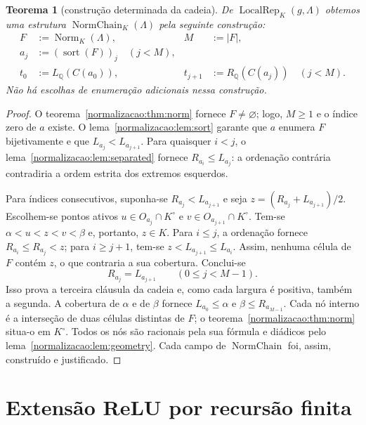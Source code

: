 \documentclass[12pt,a4paper]{article}
\theoremstyle{preciso}
\newtheorem{teorema}{Teorema}[section]
\theoremstyle{definition}
\newcommand{\Q}{\mathbb Q}
\newcommand{\Norm}{\operatorname{Norm}}
\newcommand{\Loc}{\operatorname{LocalRep}}
\theoremstyle{preciso}
\theoremstyle{preciso}
\theoremstyle{preciso}
\theoremstyle{preciso}
\theoremstyle{definition}
\theoremstyle{preciso}
\theoremstyle{definition}
\theoremstyle{preciso}
\theoremstyle{preciso}
\theoremstyle{definition}
\begin{document}
\begin{teorema}[construção determinada da cadeia]\label{map:normalizacao:7.4}\label{normalizacao:thm:chain}
De $\Loc_K(g,\Lambda)$ obtemos uma estrutura
$\operatorname{NormChain}_K(\Lambda)$ pela seguinte construção:
\begin{align*}
 F&:=\Norm_K(\Lambda),& M&:=|F|,\\
 a_j&:=(\operatorname{sort}(F))_j\quad(j<M),\\
 t_0&:=L_\Q(C(a_0)),&
 t_{j+1}&:=R_\Q(C(a_j))\quad(j<M).
\end{align*}
Não há escolhas de enumeração adicionais nessa construção.
\end{teorema}
\begin{proof}
O teorema~\ref{normalizacao:thm:norm} fornece $F\ne\varnothing$; logo, $M\ge1$
e o índice zero de $a$ existe. O lema~\ref{normalizacao:lem:sort} garante
que $a$ enumera $F$ bijetivamente e que $L_{a_j}<L_{a_{j+1}}$.
Para quaisquer $i<j$, o lema~\ref{normalizacao:lem:separated} fornece
$R_{a_i}\le L_{a_j}$: a ordenação contrária contradiria a ordem
estrita dos extremos esquerdos.

Para índices consecutivos, suponha-se
$R_{a_j}<L_{a_{j+1}}$ e seja
$z=(R_{a_j}+L_{a_{j+1}})/2$. Escolhem-se pontos ativos
$u\in O_{a_j}\cap K^\circ$ e
$v\in O_{a_{j+1}}\cap K^\circ$. Tem-se
$\alpha<u<z<v<\beta$ e, portanto, $z\in K$.
Para $i\le j$, a ordenação fornece $R_{a_i}\le R_{a_j}<z$;
para $i\ge j+1$, tem-se $z<L_{a_{j+1}}\le L_{a_i}$.
Assim, nenhuma célula de $F$ contém $z$, o que contraria a sua cobertura.
Conclui-se
\[
 R_{a_j}=L_{a_{j+1}}\qquad(0\le j<M-1).
\]
Isso prova a terceira cláusula da cadeia e, como cada largura é
positiva, também a segunda. A cobertura de $\alpha$ e de $\beta$
fornece $L_{a_0}\le\alpha$ e $\beta\le R_{a_{M-1}}$.
Cada nó interno é a interseção de duas células distintas de $F$;
o teorema~\ref{normalizacao:thm:norm} situa-o em $K^\circ$.
Todos os nós são racionais pela sua fórmula e diádicos pelo
lema~\ref{normalizacao:lem:geometry}. Cada campo de
$\operatorname{NormChain}$ foi, assim, construído e justificado.
\end{proof}

\section{Extensão ReLU por recursão finita}
\label{normalizacao:sec:relu}
\end{document}

